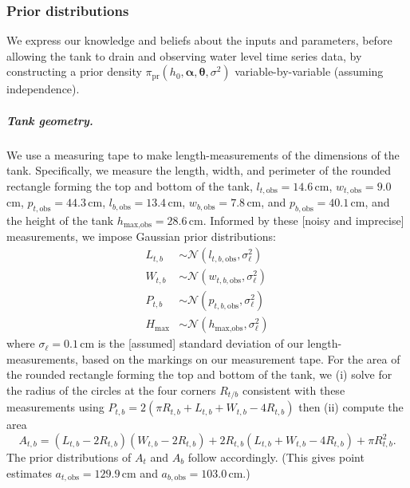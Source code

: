 \documentclass[openacc]{rsproca_new}%
\begin{document}
\subsubsection{Prior distributions} 
We express our knowledge and beliefs about the inputs and parameters, before allowing the tank to drain and observing water level time series data, by constructing a prior density $\pi_{\text{pr}}(h_0, \boldsymbol \alpha, \boldsymbol \theta, \sigma^2)$ variable-by-variable (assuming independence). 
\vspace{-\baselineskip}
\subparagraph{Tank geometry.} We use a measuring tape to make length-measurements of the dimensions of the tank.
Specifically, we measure the length, width, and perimeter of the rounded rectangle forming the top and bottom of the tank,
$l_{t, \text{obs}}=14.6$\,cm, $w_{t, \text{obs}}=9.0$\,cm, $p_{t, \text{obs}}=44.3$\,cm,
$l_{b, \text{obs}}=13.4$\,cm, $w_{b, \text{obs}}=7.8$\,cm, and $p_{b, \text{obs}}=40.1$\,cm, and the height of the tank $h_{\text{max}, \text{obs}}=28.6$\,cm.
Informed by these [noisy and imprecise] measurements, we impose Gaussian prior distributions:
\begin{align}
L_{t,b} &\sim \mathcal{N}(l_{t,b, \text{obs}}, \sigma_\ell^2) \\
W_{t,b} &\sim \mathcal{N}(w_{t,b, \text{obs}}, \sigma_\ell^2) \\
P_{t,b} &\sim \mathcal{N}(p_{t,b, \text{obs}}, \sigma_\ell^2) \\
H_{\text{max}} &\sim \mathcal{N}(h_{\text{max}, \text{obs}}, \sigma_\ell^2)
\end{align}
where $\sigma_\ell=0.1$\,cm is the [assumed] standard deviation of our length-measurements, based on the markings on our measurement tape. 
For the area of the rounded rectangle forming the top and bottom of the tank,
we (i) solve for the radius of the circles at the four corners $R_{t/b}$ consistent with these measurements using $P_{t,b}=2(\pi R_{t,b} + L_{t,b}+W_{t,b}-4R_{t,b})$ then (ii) compute the area \cite{rounded_rect}
\begin{equation}
	A_{t,b}= (L_{t,b}-2R_{t,b})(W_{t,b}-2R_{t,b})+ 2R_{t,b} (L_{t,b}+W_{t,b} -4R_{t,b}) + \pi R_{t,b}^2.
\end{equation}
The prior distributions of $A_t$ and $A_b$ follow accordingly. 
(This gives point estimates $a_{t, \text{obs}}=129.9$\,cm and $a_{b, \text{obs}}=103.0$\,cm.)
\end{document}
